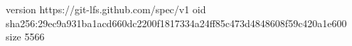 version https://git-lfs.github.com/spec/v1
oid sha256:29ec9a931ba1acd660dc2200f1817334a24ff85c473d4848608f59c420a1e600
size 5566
